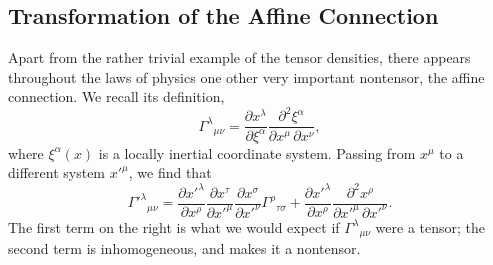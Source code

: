 
\subsection{Transformation of the Affine Connection}\label{sec:4.5}

Apart from the rather trivial example of the tensor densities, there appears
throughout the laws of physics one other very important nontensor, the affine
connection. We recall its definition,
\begin{equation}
  \Gamma^\lambda{}_{\mu\nu}
  =
  \frac{\partial x^\lambda}{\partial \xi^\alpha}
  \frac{\partial^2\xi^\alpha}
       {\partial x^\mu\,\partial x^\nu},
  \tag{4.5.1}\label{eq:4.5.1}
\end{equation}
where \(\xi^\alpha(x)\) is a locally inertial coordinate system. Passing from
\(x^\mu\) to a different system \(x'^\mu\), we find that
\begin{equation}
  \Gamma'^\lambda{}_{\mu\nu}
  =
  \frac{\partial x'^\lambda}{\partial x^\rho}
  \frac{\partial x^\tau}{\partial x'^\mu}
  \frac{\partial x^\sigma}{\partial x'^\nu}
  \Gamma^\rho{}_{\tau\sigma}
  +
  \frac{\partial x'^\lambda}{\partial x^\rho}
  \frac{\partial^2x^\rho}
       {\partial x'^\mu\,\partial x'^\nu}.
  \tag{4.5.2}\label{eq:4.5.2}
\end{equation}
The first term on the right is what we would expect if
\(\Gamma^\lambda{}_{\mu\nu}\) were a tensor; the second term is
inhomogeneous, and makes it a nontensor.

